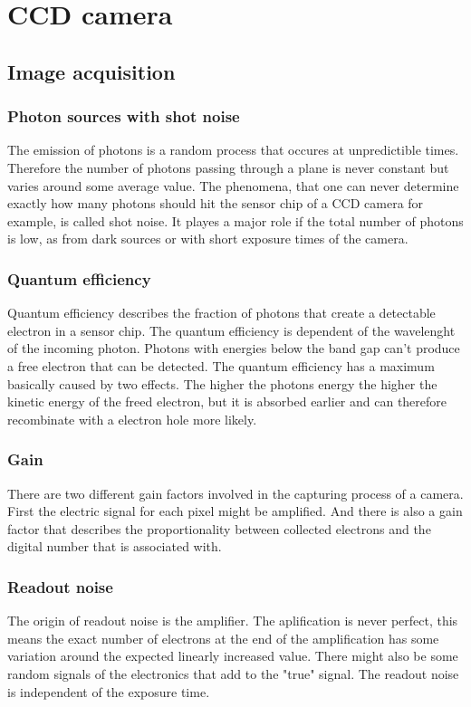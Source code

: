 \chapter{CCD camera}

\section{Image acquisition}
\subsection{Photon sources with shot noise}
The emission of photons is a random process that occures at unpredictible times. Therefore the number of photons passing through a plane is never constant but varies around some average value. The phenomena, that one can never determine exactly how many photons should hit the sensor chip of a CCD camera for example, is called shot noise. It playes a major role if the total number of photons is low, as from dark sources or with short exposure times of the camera.
\subsection{Quantum efficiency}
Quantum efficiency describes the fraction of photons that create a detectable electron in a sensor chip. The quantum efficiency is dependent of the wavelenght of the incoming photon. Photons with energies below the band gap can't produce a free electron that can be detected. The quantum efficiency has a maximum basically caused by two effects. The higher the photons energy the higher the kinetic energy of the freed electron, but it is absorbed earlier and can therefore recombinate with a electron hole more likely.
\subsection{Gain}
There are two different gain factors involved in the capturing process of a camera. First the electric signal for each pixel might be amplified. And there is also a gain factor that describes the proportionality between collected electrons and the digital number that is associated with.
\subsection{Readout noise}
The origin of readout noise is the amplifier. The aplification is never perfect, this means the exact number of electrons at the end of the amplification has some variation around the expected linearly increased value. There might also be some random signals of the electronics that add to the "true" signal. The readout noise is independent of the exposure time.

